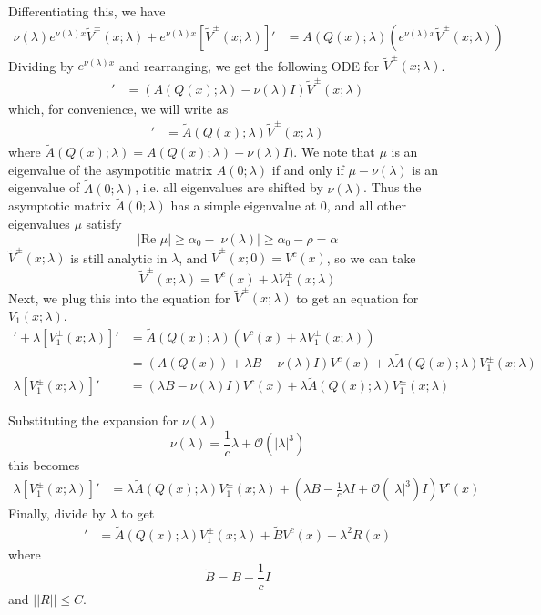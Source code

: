 \documentclass[thesis.tex]{subfiles}
\begin{document}
Differentiating this, we have
\begin{align*}
\nu(\lambda) e^{\nu(\lambda)x}\tilde{V}^\pm(x; \lambda) 
+ e^{\nu(\lambda)x}[\tilde{V}^\pm(x; \lambda)]'
&= A(Q(x); \lambda) (e^{\nu(\lambda)x}\tilde{V}^\pm(x; \lambda))
\end{align*}
Dividing by $e^{\nu(\lambda)x}$ and rearranging, we get the following ODE for $\tilde{V}^\pm(x; \lambda)$.
\begin{align*}
[\tilde{V}^\pm(x; \lambda)]'
&= (A(Q(x); \lambda) - \nu(\lambda)I)\tilde{V}^\pm(x; \lambda)
\end{align*}
which, for convenience, we will write as
\begin{align*}
[\tilde{V}^\pm(x; \lambda)]'
&= \tilde{A}(Q(x); \lambda)\tilde{V}^\pm(x; \lambda)
\end{align*}
where $\tilde{A}(Q(x); \lambda) = A(Q(x); \lambda) - \nu(\lambda)I)$. We note that $\mu$ is an eigenvalue of the asympotitic matrix $A(0; \lambda)$ if and only if $\mu - \nu(\lambda)$ is an eigenvalue of $\tilde{A}(0; \lambda)$, i.e. all eigenvalues are shifted by $\nu(\lambda)$. Thus the asymptotic matrix $\tilde{A}(0; \lambda)$ has a simple eigenvalue at 0, and all other eigenvalues $\mu$ satisfy
\[
|\text{Re }\mu| \geq \alpha_0 - |\nu(\lambda)| \geq \alpha_0 - \rho = \alpha
\]
$\tilde{V}^\pm(x; \lambda)$ is still analytic in $\lambda$, and $\tilde{V}^\pm(x; 0) = V^c(x)$, so we can take 
\[
\tilde{V}^\pm(x; \lambda) = V^c(x) + \lambda V_1^\pm(x; \lambda)
\]
Next, we plug this into the equation for $\tilde{V}^\pm(x; \lambda)$ to get an equation for $V_1(x; \lambda)$.
\begin{align*}
[V^c(x)]' + \lambda [V_1^\pm(x; \lambda)]'
&= \tilde{A}(Q(x); \lambda)(V^c(x) + \lambda V_1^\pm(x; \lambda)) \\
&= (A(Q(x)) + \lambda B - \nu(\lambda)I)V^c(x) + \lambda \tilde{A}(Q(x); \lambda) V_1^\pm(x; \lambda) \\
\lambda [V_1^\pm(x; \lambda)]' &= (\lambda B - \nu(\lambda)I)V^c(x) + \lambda \tilde{A}(Q(x); \lambda) V_1^\pm(x; \lambda)
\end{align*}

Substituting the expansion for $\nu(\lambda)$
\[
\nu(\lambda) = \frac{1}{c} \lambda + \mathcal{O}(|\lambda|^3)
\]
this becomes
\begin{align*}
\lambda [V_1^\pm(x; \lambda)]' &= \lambda \tilde{A}(Q(x); \lambda) V_1^\pm(x; \lambda) + \left(\lambda B - \frac{1}{c} \lambda I + \mathcal{O}(|\lambda|^3)I\right)V^c(x)
\end{align*}
Finally, divide by $\lambda$ to get
\begin{align*}
[V_1^\pm(x; \lambda)]' &= \tilde{A}(Q(x); \lambda) V_1^\pm(x; \lambda) + \tilde{B} V^c(x) + \lambda^2 R(x)
\end{align*}
where
\[
\tilde{B} = B - \frac{1}{c} I
\]
and $||R|| \leq C$. 
\end{document}
